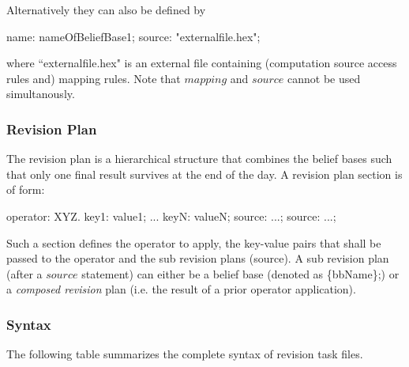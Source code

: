\documentclass[a4paper,11pt]{article}
\theoremstyle{definition}
\newcommand{\inlinecode}[1]{\textsf{#1}\xspace }
\begin{document}
				Alternatively they can also be defined by
				\begin{exampleprogram}
name: nameOfBeliefBase1;
source: "externalfile.hex";
				\end{exampleprogram}
				where ``externalfile.hex" is an external file containing (computation source access rules and) mapping rules. Note that $\mathit{mapping}$ and $\mathit{source}$
				cannot be used simultanously.
				
			\subsubsection{Revision Plan}
			
				The revision plan is a hierarchical structure that combines the belief bases such that only one final result survives at the end of the day. A revision plan section is of
				form:
				\begin{exampleprogram}
operator: XYZ.
key1: value1;
...
keyN: valueN;
source: ...;
source: ...;
				\end{exampleprogram}
				Such a section defines the operator to apply, the key-value pairs that shall be passed to the operator and the sub revision plans (\inlinecode{source}). A sub revision plan
				(after a $\mathit{source}$ statement) can either be a belief base (denoted as \inlinecode{\{bbName\};}) or a \emph{composed revision} plan (i.e. the result of a prior operator application).

			\subsubsection{Syntax}
			
				The following table summarizes the complete syntax of revision task files.
						
\end{document}
